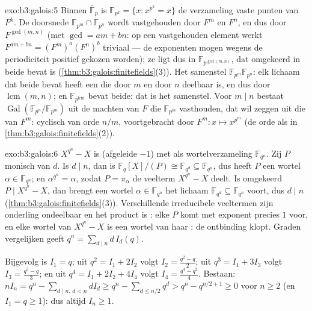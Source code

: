 \begin{solution}{exo:b3:galois:5}
Binnen $\bar{\mathbb F}_p$ is $\mathbb F_{p^k} = \{x : x^{p^k} =
x\}$ de verzameling vaste punten van $F^k$. De doorsnede $\mathbb
F_{p^m} \cap \mathbb F_{p^n}$ wordt vastgehouden door $F^m$ en
$F^n$, en dus door $F^{\gcd(m,n)}$ (met $\gcd = am + bn$: op een
vastgehouden element werkt $F^{am + bn} = (F^m)^a(F^n)^b$
triviaal --- de exponenten mogen wegens de periodiciteit positief
gekozen worden); ze ligt dus in $\mathbb F_{p^{\gcd(m,n)}}$, dat
omgekeerd in beide bevat is
(\cref{thm:b3:galois:finitefields}(3)). Het samenstel $\mathbb
F_{p^m}\mathbb F_{p^n}$: elk lichaam dat beide bevat heeft een
 die door $m$ en door $n$ deelbaar is, en dus door
$\operatorname{lcm}(m,n)$; en $\mathbb F_{p^{\operatorname{lcm}}}$
bevat beide: dat is het samenstel. Voor $m \mid n$ bestaat
$\operatorname{Gal}(\mathbb F_{p^n}/\mathbb F_{p^m})$ uit de
machten van $F$ die $\mathbb F_{p^m}$ vasthouden, dat wil zeggen
uit die van $F^m$: cyclisch van orde $n/m$, voortgebracht door
$F^m \colon x \mapsto x^{p^m}$ (de orde als in
\cref{thm:b3:galois:finitefields}(2)).
\end{solution}

\begin{solution}{exo:b3:galois:6}
$X^{q^n} - X$ is  (afgeleide $-1$) met als
wortelverzameling $\mathbb F_{q^n}$. Zij $P$ monisch 
van  $d$. Is $d \mid n$, dan is $\mathbb F_q[X]/(P) \cong
\mathbb F_{q^d} \subseteq \mathbb F_{q^n}$, dus heeft $P$ een
wortel $\alpha \in \mathbb F_{q^n}$; en $\alpha^{q^n} = \alpha$,
zodat $P = \pi_\alpha$ de veelterm $X^{q^n} - X$ deelt. Is
omgekeerd $P \mid X^{q^n} - X$, dan brengt een wortel $\alpha \in
\mathbb F_{q^n}$ het lichaam $\mathbb F_{q^d} \subseteq \mathbb
F_{q^n}$ voort, dus $d \mid n$
(\cref{thm:b3:galois:finitefields}(3)). Verschillende
irreducibele veeltermen zijn onderling ondeelbaar en het product
is : elke $P$ komt met exponent precies $1$ voor, en elke
wortel van $X^{q^n}-X$ is een wortel van haar :
de ontbinding klopt. Graden vergelijken geeft $q^n = \sum_{d\mid
n} d\,I_d(q)$.

Bijgevolg is $I_1 = q$; uit $q^2 = I_1 + 2I_2$ volgt $I_2 =
\frac{q^2 - q}2$; uit $q^3 = I_1 + 3I_3$ volgt $I_3 = \frac{q^3 -
q}3$; en uit $q^4 = I_1 + 2I_2 + 4I_4$ volgt $I_4 = \frac{q^4 -
q^2}4$. Bestaan: $nI_n = q^n - \sum_{d \mid n,\, d < n} dI_d \geq
q^n - \sum_{d \leq n/2} q^d > q^n - q^{n/2 + 1} \geq 0$ voor $n
\geq 2$ (en $I_1 = q \geq 1$): dus altijd $I_n \geq 1$.
\end{solution}

